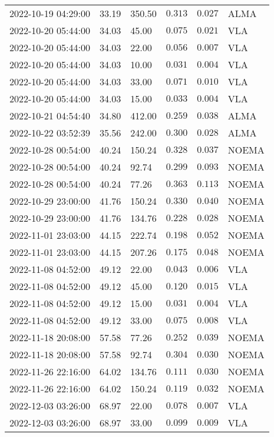 \documentclass{nature_plusfigure}
\begin{document}
\begin{supplement}
\begin{center}
\begin{longtable}{llllll}
2022-10-19 04:29:00 & 33.19 & 350.50 & $0.313$ & $0.027$ & ALMA \\ 
2022-10-20 05:44:00 & 34.03 & 45.00 & $0.075$ & $0.021$ & VLA \\ 
2022-10-20 05:44:00 & 34.03 & 22.00 & $0.056$ & $0.007$ & VLA \\ 
2022-10-20 05:44:00 & 34.03 & 10.00 & $0.031$ & $0.004$ & VLA \\ 
2022-10-20 05:44:00 & 34.03 & 33.00 & $0.071$ & $0.010$ & VLA \\ 
2022-10-20 05:44:00 & 34.03 & 15.00 & $0.033$ & $0.004$ & VLA \\ 
2022-10-21 04:54:40 & 34.80 & 412.00 & $0.259$ & $0.038$ & ALMA \\ 
2022-10-22 03:52:39 & 35.56 & 242.00 & $0.300$ & $0.028$ & ALMA \\ 
2022-10-28 00:54:00 & 40.24 & 150.24 & $0.328$ & $0.037$ & NOEMA \\ 
2022-10-28 00:54:00 & 40.24 & 92.74 & $0.299$ & $0.093$ & NOEMA \\ 
2022-10-28 00:54:00 & 40.24 & 77.26 & $0.363$ & $0.113$ & NOEMA \\ 
2022-10-29 23:00:00 & 41.76 & 150.24 & $0.330$ & $0.040$ & NOEMA \\ 
2022-10-29 23:00:00 & 41.76 & 134.76 & $0.228$ & $0.028$ & NOEMA \\ 
2022-11-01 23:03:00 & 44.15 & 222.74 & $0.198$ & $0.052$ & NOEMA \\ 
2022-11-01 23:03:00 & 44.15 & 207.26 & $0.175$ & $0.048$ & NOEMA \\ 
2022-11-08 04:52:00 & 49.12 & 22.00 & $0.043$ & $0.006$ & VLA \\ 
2022-11-08 04:52:00 & 49.12 & 45.00 & $0.120$ & $0.015$ & VLA \\ 
2022-11-08 04:52:00 & 49.12 & 15.00 & $0.031$ & $0.004$ & VLA \\ 
2022-11-08 04:52:00 & 49.12 & 33.00 & $0.075$ & $0.008$ & VLA \\ 
2022-11-18 20:08:00 & 57.58 & 77.26 & $0.252$ & $0.039$ & NOEMA \\ 
2022-11-18 20:08:00 & 57.58 & 92.74 & $0.304$ & $0.030$ & NOEMA \\ 
2022-11-26 22:16:00 & 64.02 & 134.76 & $0.111$ & $0.030$ & NOEMA \\ 
2022-11-26 22:16:00 & 64.02 & 150.24 & $0.119$ & $0.032$ & NOEMA \\ 
2022-12-03 03:26:00 & 68.97 & 22.00 & $0.078$ & $0.007$ & VLA \\ 
2022-12-03 03:26:00 & 68.97 & 33.00 & $0.099$ & $0.009$ & VLA \\ 

\end{longtable}
\end{center}
\end{supplement}
\end{document}
